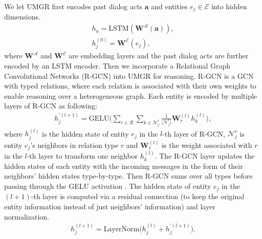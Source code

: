 \documentclass[11pt,a4paper]{article}
\begin{document}
We let UMGR first encodes past dialog acts $\boldsymbol{a}$ and entities $e_j \in \mathcal{E}$ into hidden dimensions.
\begin{equation}
\begin{split}
h_a = \text{LSTM}(\boldsymbol{W}^\mathcal{A}(\boldsymbol{a})), \\
h_j^{(0)} = \boldsymbol{W}^\mathcal{E}(e_j),
\end{split}
\end{equation}
where $\boldsymbol{W}^\mathcal{A}$ and $\boldsymbol{W}^\mathcal{E}$ are embedding layers and the past dialog acts are further encoded by an LSTM encoder.
Then we incorporate a Relational Graph Convolutional Networks (R-GCN) \cite{schlichtkrull2018modeling} into UMGR for reasoning.
R-GCN is a GCN \cite{kipf2016semi} with typed relations, where each relation is associated with their own weights to enable reasoning over a heterogeneous graph.
Each entity is encoded by multiple layers of R-GCN as following:
\begin{equation}
\begin{split}
h_j^{'(l+1)}=\text{GELU} \Big(\sum_{r \in \mathcal{R}} \sum_{k \in \mathcal{N}_j^r} \frac{1}{\vert \mathcal{N}_j^r \vert} \boldsymbol{W}_r^{(l)} h_k^{(l)}\Big),
\end{split}
\end{equation}
where $h_j^{(l)}$  is the hidden state of entity $e_j$ in the $l$-th layer of R-GCN, $\mathcal{N}_j^r$ is entity $e_j$'s neighbors in relation type $r$ and $\boldsymbol{W}_r^{(l)}$ is the weight associated with $r$ in the $l$-th layer to transform one neighbor $h_k^{(l)}$.
The R-GCN layer updates the hidden states of each entity with the incoming messages in the form of their neighbors' hidden states type-by-type.
Then R-GCN sums over all types before passing through the GELU activation \cite{hendrycks2016gaussian}.
The hidden state of entity $e_j$ in the $(l+1)$-th layer is computed via a residual connection \cite{he2016deep} (to keep the original entity information instead of just neighbors' information) and layer normalization.
\begin{equation}
\begin{split}
h_j^{(l+1)}=\text{LayerNorm}\Big(h_j^{(l)} + h_j^{'(l+1)}\Big).
\end{split}
\end{equation}
\end{document}
